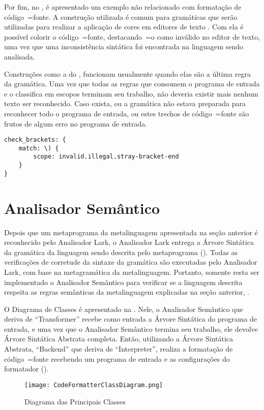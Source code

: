 Por fim,
no ,
é apresentado um exemplo não relacionado com formatação de código~=fonte.
A construção utilizada é comum para gramáticas que serão utilizadas para realizar a aplicação de cores em editores de texto \cite{vsCodeSyntaxHighlighthing}.
Com ela é possível colorir o código~=fonte,
destacando~=o como inválido no editor de texto,
uma vez que uma inconsistência sintática foi encontrada na linguagem sendo analisada.

Construções como a do ,
funcionam usualmente quando elas são a última regra da gramática.
Uma vez que todas as regras que consomem o programa de entrada e
o classifica em escopos terminam seu trabalho,
não deveria existir mais nenhum texto ser reconhecido.
Caso exista,
ou a gramática não estava preparada para reconhecer todo o programa de entrada,
ou estes trechos de código~=fonte são frutos de algum erro no programa de entrada.
\begin{lstlisting}[caption={Exemplo de Gramática, Reconhecimento de Erros},label={exemploDeGramaticaPawn5},style=yaml_style]
check_brackets: {
    match: \) {
        scope: invalid.illegal.stray-bracket-end
    }
}
\end{lstlisting}


\section{Analisador Semântico}

Depois que um metaprograma da metalinguagem apresentada na seção anterior é reconhecido pelo Analisador Lark,
o Analisador Lark entrega a Árvore Sintática da gramática da linguagem sendo descrita pelo metaprograma ().
Todas as verificações de corretude da sintaxe da gramática são executadas pelo Analisador Lark,
com base na metagramática da metalinguagem.
Portanto,
somente resta ser implementado o Analisador Semântico para verificar se a linguagem descrita respeita as regras semânticas da metalinguagem explicadas na seção anterior,
.

O Diagrama de Classes é apresentado na .
Nele,
o Analisador Semântico que deriva de ``Transformer'' recebe como entrada a Árvore Sintática do programa de entrada,
e uma vez que o Analisador Semântico termina seu trabalho,
ele devolve Árvore Sintática Abstrata completa.
Então,
utilizando a Árvore Sintática Abstrata,
``Backend'' que deriva de ``Interpreter'',
realiza a formatação de código~=fonte recebendo um programa de entrada e
as configurações do formatador ().
\begin{figure}[!htb]
\caption{Diagrama das Principais Classes}
\label{CodeFormatterClassDiagram}
\centering
\texttt{[image: CodeFormatterClassDiagram.png]}
\end{figure}

